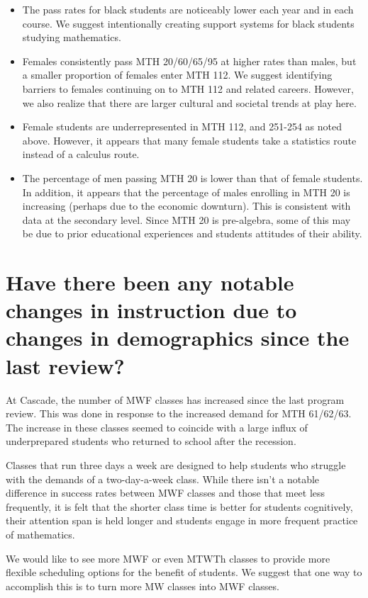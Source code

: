 \begin{itemize}
   \item The pass rates for black students are noticeably lower each year and in each course. We suggest intentionally creating support systems for black students studying mathematics.
   \item Females consistently pass MTH 20/60/65/95 at higher rates than males, but a smaller proportion of females enter MTH 112. We suggest identifying barriers to females continuing on to MTH 112 and related careers. However, we also realize that there are larger cultural and societal trends at play here.
   \item Female students are underrepresented in MTH 112, and 251-254 as noted above. However, it appears that many female students take a statistics route instead of a calculus route.
   \item The percentage of men passing MTH 20 is lower than that of female students. In addition, it appears that the percentage of males enrolling in MTH 20 is increasing (perhaps due to the economic downturn). This is consistent with data at the secondary level. Since MTH 20 is pre-algebra, some of this may be due to prior educational experiences and students attitudes of their ability.
 \end{itemize}

 \section{Have there been any notable changes in instruction due to changes in demographics since the last review?}
 At Cascade, the number of MWF classes has increased since the last program review. This was done in response to the increased demand for MTH 61/62/63. The increase in these classes seemed to coincide with a large influx of underprepared students who returned to school after the recession.

  Classes that run three days a week are designed to help students who struggle with the demands of a two-day-a-week class.  While there isn't a notable difference in success rates between MWF classes and those that meet less frequently, it is felt that the shorter class time is better for students cognitively, their attention span is held longer and students engage in more frequent practice of mathematics.  

  We would like to see more MWF or even MTWTh classes to provide more flexible scheduling options for the benefit of students. We suggest that one way to accomplish this is to turn more MW classes into MWF classes.

